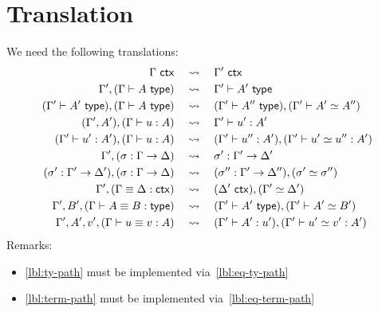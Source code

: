 
\section{Translation}
\label{sec:translation}

We need the following translations:
%
\begin{align}
  \Gamma\ \mathsf{ctx}
  &\quad\leadsto\quad
  \Gamma'\ \mathsf{ctx}
  \\
  \Gamma', (\Gamma \vdash A \ \mathsf{type})
  &\quad\leadsto\quad
  \Gamma' \vdash A' \ \mathsf{type}
  \\
  \label{lbl:ty-path}
  (\Gamma' \vdash A' \ \mathsf{type}), (\Gamma \vdash A \ \mathsf{type})
  &\quad\leadsto\quad
  (\Gamma' \vdash A'' \ \mathsf{type}), (\Gamma' \vdash A' \simeq A'')
  \\
  (\Gamma', A'), (\Gamma \vdash u : A)
  &\quad\leadsto\quad
  \Gamma' \vdash u' : A'
  \\
  \label{lbl:term-path}
  (\Gamma' \vdash u' : A'), (\Gamma \vdash u : A)
  &\quad\leadsto\quad
  (\Gamma' \vdash u'' : A'), (\Gamma' \vdash u' \simeq u'' : A')
  \\
  \Gamma', (\sigma : \Gamma \to \Delta)
  &\quad\leadsto\quad
  \sigma' : \Gamma' \to \Delta'
  \\
  (\sigma' : \Gamma' \to \Delta'), (\sigma : \Gamma \to \Delta)
  &\quad\leadsto\quad
  (\sigma'' : \Gamma' \to \Delta''), (\sigma' \simeq \sigma'')
  \\
  \Gamma', (\Gamma \equiv \Delta : \mathsf{ctx})
  &\quad\leadsto\quad
  (\Delta'\ \mathsf{ctx}), (\Gamma' \simeq \Delta')
  \\
  \label{lbl:eq-ty-path}
  \Gamma', B', (\Gamma \vdash A \equiv B : \mathsf{type})
  &\quad\leadsto\quad
  (\Gamma' \vdash A' \ \mathsf{type}), (\Gamma' \vdash A' \simeq B')
  \\
  \label{lbl:eq-term-path}
  \Gamma', A', v', (\Gamma \vdash u \equiv v : A)
  &\quad\leadsto\quad
  (\Gamma' \vdash A' : u'), (\Gamma' \vdash u' \simeq v' : A')
\end{align}
%
Remarks:
%
\begin{itemize}
\item \eqref{lbl:ty-path} must be implemented via~\eqref{lbl:eq-ty-path}
\item \eqref{lbl:term-path} must be implemented via~\eqref{lbl:eq-term-path}
\end{itemize}





